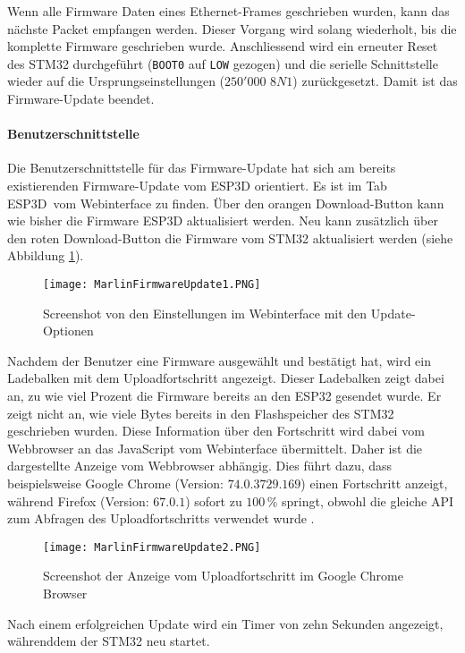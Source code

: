 Wenn alle Firmware Daten eines Ethernet-Frames geschrieben wurden, kann das nächste Packet empfangen werden. Dieser Vorgang wird solang wiederholt, bis die komplette Firmware geschrieben wurde. Anschliessend wird ein erneuter Reset des STM32 durchgeführt (\texttt{BOOT0} auf \texttt{LOW} gezogen) und die serielle Schnittstelle wieder auf die Ursprungseinstellungen ($250'000$ $8N1$) zurückgesetzt. Damit ist das Firmware-Update beendet.

\paragraph{Benutzerschnittstelle}
Die Benutzerschnittstelle für das Firmware-Update hat sich am bereits existierenden Firmware-Update vom ESP3D orientiert. Es ist im Tab \flqq ESP3D\frqq\ vom Webinterface zu finden. Über den orangen Download-Button kann wie bisher die Firmware ESP3D aktualisiert werden. Neu kann zusätzlich über den roten Download-Button die Firmware vom STM32 aktualisiert werden (siehe Abbildung \ref{pic:MarlinFirmwareUpdate1}).

\begin{figure}[h]
	\centering
	\texttt{[image: MarlinFirmwareUpdate1.PNG]}
	\caption{Screenshot von den Einstellungen im Webinterface mit den Update-Optionen}
	\label{pic:MarlinFirmwareUpdate1}
\end{figure}

Nachdem der Benutzer eine Firmware ausgewählt und bestätigt hat, wird ein Ladebalken mit dem Uploadfortschritt angezeigt. Dieser Ladebalken zeigt dabei an, zu wie viel Prozent die Firmware bereits an den ESP32 gesendet wurde. Er zeigt nicht an, wie viele Bytes bereits in den Flashspeicher des STM32 geschrieben wurden. Diese Information über den Fortschritt wird dabei vom Webbrowser an das JavaScript vom Webinterface übermittelt. Daher ist die dargestellte Anzeige vom Webbrowser abhängig. Dies führt dazu, dass beispielsweise Google Chrome (Version: $74.0.3729.169$) einen Fortschritt anzeigt, während Firefox (Version: $67.0.1$) sofort zu $100\,\%$ springt, obwohl die gleiche API zum Abfragen des Uploadfortschritts verwendet wurde \cite{XMLHttpRequest_upload, XMLHttpRequest_progress}.

\begin{figure}[h]
	\centering
	\texttt{[image: MarlinFirmwareUpdate2.PNG]}
	\caption{Screenshot der Anzeige vom Uploadfortschritt im Google Chrome Browser}
	\label{pic:MarlinFirmwareUpdate2}
\end{figure}

Nach einem erfolgreichen Update wird ein Timer von zehn Sekunden angezeigt, währenddem der STM32 neu startet.
